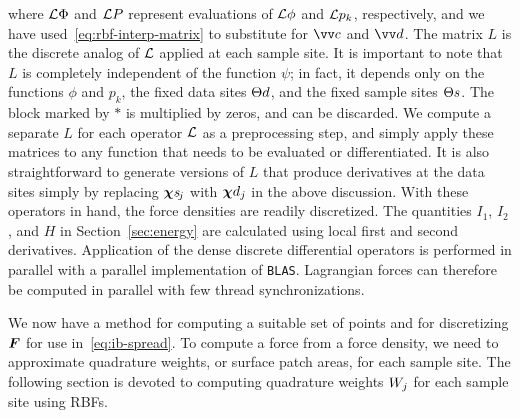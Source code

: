 where $\mathcal{L}\Phi$ and $\mathcal{L} P$ represent evaluations of $\mathcal{L}\phi$ and $\mathcal{L} p_k$, respectively,
and we have used~\eqref{eq:rbf-interp-matrix} to substitute for $\arr{c}$ and $\arr{d}$.
The matrix $L$ is the discrete analog of $\mathcal{L}$ applied at each sample site. It is
important to note that $L$ is completely independent of the function $\psi$; in fact, it
depends only on the functions $\phi$ and $p_k$, the fixed data sites $\data\sites$, and
the fixed sample sites $\sample\sites$.  The block marked by $\ast$ is multiplied by
zeros, and can be discarded. We compute a separate $L$ for each operator $\mathcal{L}$ as a
preprocessing step, and simply apply these matrices to any function that needs to be
evaluated or differentiated. It is also straightforward to generate versions of $L$ that
produce derivatives at the data sites simply by replacing $\Xpsj$ with $\data\Xp_j$ in
the above discussion. With these operators in hand, the force densities are readily
discretized. The quantities $I_1$, $I_2$, and $H$ in Section~\ref{sec:energy} are
calculated using local first and second derivatives. Application of the dense discrete
differential operators is performed in parallel with a parallel implementation of
\texttt{BLAS}. Lagrangian forces can therefore be computed in parallel with few thread
synchronizations.

We now have a method for computing a suitable set of points and for discretizing $\boldsymbol{F}$ for
use in~\eqref{eq:ib-spread}. To compute a force from a force density, we need to
approximate quadrature weights, or surface patch areas, for each sample site. The
following section is devoted to computing quadrature weights $\weight[j]$ for each
sample site using RBFs.

